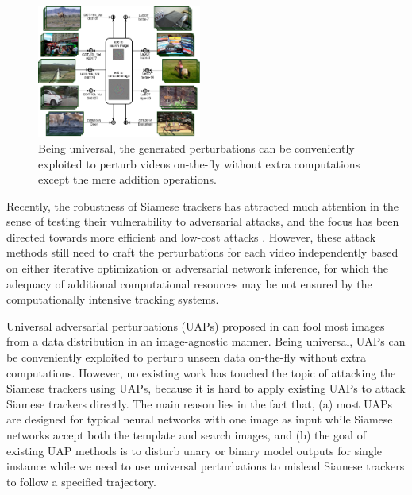 \documentclass[journal]{IEEEtran}
\begin{document}
\begin{figure}[t]
  \centering
  \includegraphics[width=0.48\textwidth]{images_imperceptible/UAP_small.pdf}
  \caption{Being universal, the generated perturbations can be conveniently exploited to perturb videos on-the-fly without extra computations except the mere addition operations.} 
  \label{fig:UAP}
\end{figure}

Recently, the robustness of Siamese trackers has attracted much attention in the sense of testing their vulnerability to adversarial attacks, and the focus has been directed towards more efficient and low-cost attacks \cite{TTP,FAN,SPARK,chen2020one}. However, these attack methods still need to craft the perturbations for each video independently based on either iterative optimization or adversarial network inference, for which the adequacy of additional computational resources may be not ensured by the computationally intensive tracking systems. 

Universal adversarial perturbations (UAPs) proposed in \cite{UAP} can fool most images from a data distribution in an image-agnostic manner. Being universal, UAPs can be conveniently exploited to perturb unseen data on-the-fly without extra computations. However, no existing work has touched the topic of attacking the Siamese trackers using UAPs, because it is hard to apply existing UAPs to attack Siamese trackers directly. The main reason lies in the fact that, (a) most UAPs are designed for typical neural networks with one image as input while Siamese networks accept both the template and search images, and (b) the goal of existing UAP methods is to disturb unary or binary model outputs for single instance while we need to use universal perturbations to mislead Siamese trackers to follow a specified trajectory.
  
\end{document}
